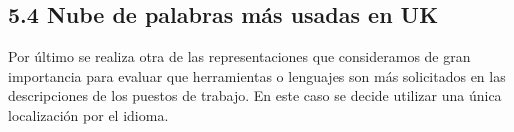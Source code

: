 \documentclass[
]{article}
\newenvironment{Shaded}{\begin{snugshade}}{\end{snugshade}}
\newcommand{\DataTypeTok}[1]{\textcolor[rgb]{0.87,0.87,0.75}{#1}}
\newcommand{\KeywordTok}[1]{\textcolor[rgb]{0.94,0.87,0.69}{#1}}
\newcommand{\NormalTok}[1]{\textcolor[rgb]{0.80,0.80,0.80}{#1}}
\newcommand{\OperatorTok}[1]{\textcolor[rgb]{0.94,0.94,0.82}{#1}}
\newcommand{\OtherTok}[1]{\textcolor[rgb]{0.94,0.94,0.56}{#1}}
\newcommand{\StringTok}[1]{\textcolor[rgb]{0.80,0.58,0.58}{#1}}
\begin{document}
\hypertarget{nube-de-palabras-muxe1s-usadas-en-uk}{%
\subsection{5.4 Nube de palabras más usadas en
UK}\label{nube-de-palabras-muxe1s-usadas-en-uk}}

Por último se realiza otra de las representaciones que consideramos de
gran importancia para evaluar que herramientas o lenguajes son más
solicitados en las descripciones de los puestos de trabajo. En este caso
se decide utilizar una única localización por el idioma.

\begin{Shaded}
\end{Shaded}
\end{document}
